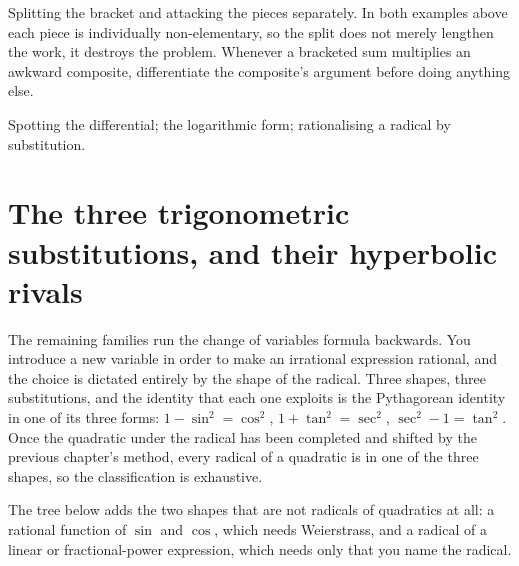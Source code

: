 \begin{trap}
Splitting the bracket and attacking the pieces separately. In both examples above each piece is individually non-elementary, so the split does not merely lengthen the work, it destroys the problem. Whenever a bracketed sum multiplies an awkward composite, differentiate the composite's argument before doing anything else.
\end{trap}

\begin{seealsob}Spotting the differential; the logarithmic form; rationalising a radical by substitution.\end{seealsob}

\section{The three trigonometric substitutions, and their hyperbolic rivals}

The remaining families run the change of variables formula backwards. You introduce a new variable in order to make an irrational expression rational, and the choice is dictated entirely by the shape of the radical. Three shapes, three substitutions, and the identity that each one exploits is the Pythagorean identity in one of its three forms: $1-\sin^2=\cos^2$, $1+\tan^2=\sec^2$, $\sec^2-1=\tan^2$. Once the quadratic under the radical has been completed and shifted by the previous chapter's method, every radical of a quadratic is in one of the three shapes, so the classification is exhaustive.

The tree below adds the two shapes that are not radicals of quadratics at all: a rational function of $\sin$ and $\cos$, which needs Weierstrass, and a radical of a linear or fractional-power expression, which needs only that you name the radical.

\begin{center}
\end{center}

